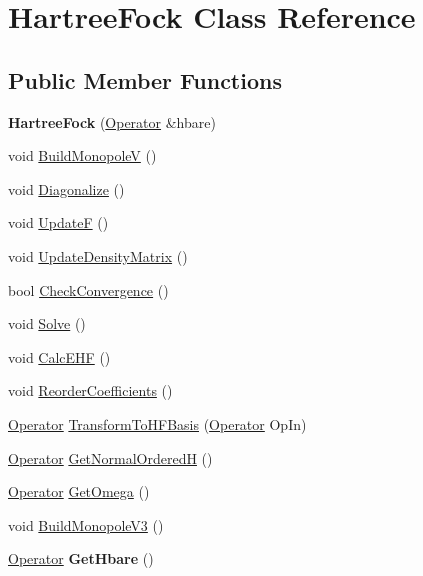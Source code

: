 \hypertarget{classHartreeFock}{\section{Hartree\-Fock Class Reference}
\label{classHartreeFock}
}
\subsection*{Public Member Functions}
\begin{DoxyCompactItemize}
\item 
\hypertarget{classHartreeFock_ad39d695b75dc9c6aa2f0e1ff81d1adc5}{{\bfseries Hartree\-Fock} (\hyperlink{classOperator}{Operator} \&hbare)}\label{classHartreeFock_ad39d695b75dc9c6aa2f0e1ff81d1adc5}

\item 
void \hyperlink{classHartreeFock_a3d6bac9b4403e4bc599a89ad0c9b6056}{Build\-Monopole\-V} ()
\item 
void \hyperlink{classHartreeFock_a00f7b0c4cb7373a3f1a69ca27a4dfaed}{Diagonalize} ()
\item 
void \hyperlink{classHartreeFock_a84fe0eb16f6e5835c920bf8fa98c4442}{Update\-F} ()
\item 
void \hyperlink{classHartreeFock_aad38c905e7e9f9e9757b5800e6910c61}{Update\-Density\-Matrix} ()
\item 
bool \hyperlink{classHartreeFock_a35ab9c4f96e68b1c9acea1d1407ecc60}{Check\-Convergence} ()
\item 
void \hyperlink{classHartreeFock_a0666507747c17845ab4f74b97414703c}{Solve} ()
\item 
void \hyperlink{classHartreeFock_aef506c5c5bc0f317ceb9c71bdc44d62b}{Calc\-E\-H\-F} ()
\item 
void \hyperlink{classHartreeFock_a2eb6754f57250a03a2e1bd3e2aef4daf}{Reorder\-Coefficients} ()
\item 
\hyperlink{classOperator}{Operator} \hyperlink{classHartreeFock_a4cb27e80982cbebfbd551ab61ea2a6d0}{Transform\-To\-H\-F\-Basis} (\hyperlink{classOperator}{Operator} Op\-In)
\item 
\hyperlink{classOperator}{Operator} \hyperlink{classHartreeFock_a17bdb52033e2f62bba72ea86bc196b37}{Get\-Normal\-Ordered\-H} ()
\item 
\hyperlink{classOperator}{Operator} \hyperlink{classHartreeFock_a53011b381945ed5c61f50b209db5bf64}{Get\-Omega} ()
\item 
void \hyperlink{classHartreeFock_a1c146af25a09f427cc626d877ec6e518}{Build\-Monopole\-V3} ()
\item 
\hypertarget{classHartreeFock_a7f2a07edc3ccaa0cf9bbc0faadfd9ddf}{\hyperlink{classOperator}{Operator} {\bfseries Get\-Hbare} ()}\label{classHartreeFock_a7f2a07edc3ccaa0cf9bbc0faadfd9ddf}

\end{DoxyCompactItemize}
